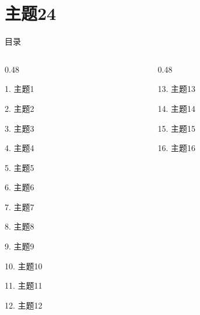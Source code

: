 \documentclass[aspectratio=169,10pt,fontset=fandol]{ctexbeamer}
\begin{document}
\section{主题24}
\begin{frame}[t,fragile]{目录}
\small
\begin{columns}[T,onlytextwidth]
\begin{column}{0.48\textwidth}
{\color{black}\small 1. 主题1\par}\vspace{0.22em}
{\color{black}\small 2. 主题2\par}\vspace{0.22em}
{\color{black}\small 3. 主题3\par}\vspace{0.22em}
{\color{black}\small 4. 主题4\par}\vspace{0.22em}
{\color{black}\small 5. 主题5\par}\vspace{0.22em}
{\color{black}\small 6. 主题6\par}\vspace{0.22em}
{\color{black}\small 7. 主题7\par}\vspace{0.22em}
{\color{black}\small 8. 主题8\par}\vspace{0.22em}
{\color{black}\small 9. 主题9\par}\vspace{0.22em}
{\color{black}\small 10. 主题10\par}\vspace{0.22em}
{\color{black}\small 11. 主题11\par}\vspace{0.22em}
{\color{black}\small 12. 主题12\par}\vspace{0.22em}
\end{column}
\begin{column}{0.48\textwidth}
{\color{black}\small 13. 主题13\par}\vspace{0.22em}
{\color{black}\small 14. 主题14\par}\vspace{0.22em}
{\color{black}\small 15. 主题15\par}\vspace{0.22em}
{\color{black}\small 16. 主题16\par}\vspace{0.22em}

\end{column}
\end{columns}
\end{frame}
\end{document}
